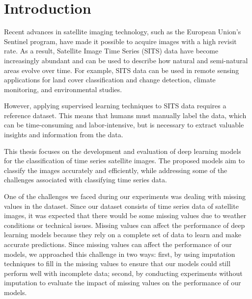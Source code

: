 \chapter{Introduction}


Recent advances in satellite imaging technology, such as the European Union's Sentinel program, have made it possible to acquire images with a high revisit rate.
As a result, Satellite Image Time Series (SITS) data have become increasingly abundant and can be used to describe how natural and semi-natural areas evolve over time.
For example, SITS data can be used in remote sensing applications for land cover classification and change detection, climate monitoring, and environmental studies.

However, applying supervised learning techniques to SITS data requires a reference dataset.
This means that humans must manually label the data, which can be time-consuming and labor-intensive, but is necessary to extract valuable insights and information from the data.


This thesis focuses on the development and evaluation of deep learning models for the classification of time series satellite images.
The proposed models aim to classify the images accurately and efficiently, while addressing some of the challenges associated with classifying time series data.

One of the challenges we faced during our experiments was dealing with missing values in the dataset. 
Since our dataset consists of time series data of satellite images, it was expected that there would be some missing values due to weather conditions or technical issues.
Missing values can affect the performance of deep learning models because they rely on a complete set of data to learn and make accurate predictions.
Since missing values can affect the performance of our models, we approached this challenge in two ways: first, by using imputation techniques to fill in the missing values to ensure that our models could still perform well with incomplete data; second, by conducting experiments without imputation to evaluate the impact of missing values on the performance of our models.

